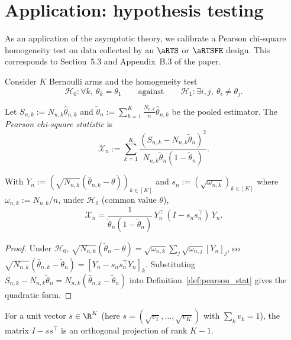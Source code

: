 \chapter{Application: hypothesis testing}
\label{chap:testing}

As an application of the asymptotic theory, we calibrate a Pearson chi-square
homogeneity test on data collected by an $\aRTS$ or $\aRTSFE$ design. This
corresponds to Section~5.3 and Appendix~B.3 of the paper.

Consider $K$ Bernoulli arms and the homogeneity test
\[
  \mathcal{H}_0 : \forall k,\ \theta_k = \theta_1
  \qquad\text{against}\qquad
  \mathcal{H}_1 : \exists i,j,\ \theta_i \ne \theta_j.
\]

\begin{definition}\label{def:pearson_stat}
Let $S_{n,k} := N_{n,k}\hat{\theta}_{n,k}$ and
$\tilde{\theta}_n := \sum_{k=1}^K \frac{N_{n,k}}{n}\hat{\theta}_{n,k}$ be the
pooled estimator. The \emph{Pearson chi-square statistic} is
\[
  \mathcal{X}_n := \sum_{k=1}^K \frac{(S_{n,k} - N_{n,k}\tilde{\theta}_n)^2}
                                        {N_{n,k}\tilde{\theta}_n(1-\tilde{\theta}_n)}.
\]
\end{definition}

\begin{lemma}\label{lem:pearson_quadform}
With $Y_n := (\sqrt{N_{n,k}}(\hat{\theta}_{n,k}-\theta))_{k\in[K]}$ and
$s_n := (\sqrt{\omega_{n,k}})_{k\in[K]}$ where $\omega_{n,k}:=N_{n,k}/n$, under
$\mathcal{H}_0$ (common value $\theta$),
\[
  \mathcal{X}_n = \frac{1}{\tilde{\theta}_n(1-\tilde{\theta}_n)}\,
                  Y_n^\top\,(I - s_n s_n^\top)\,Y_n.
\]
\end{lemma}

\begin{proof}
Under $\mathcal{H}_0$, $\sqrt{N_{n,k}}(\tilde{\theta}_n-\theta)
 = \sqrt{\omega_{n,k}}\sum_j\sqrt{\omega_{n,j}}[Y_n]_j$, so
$\sqrt{N_{n,k}}(\hat{\theta}_{n,k}-\tilde{\theta}_n) = [Y_n - s_n s_n^\top Y_n]_k$.
Substituting $S_{n,k}-N_{n,k}\tilde{\theta}_n = N_{n,k}(\hat{\theta}_{n,k}-\tilde{\theta}_n)$
into Definition~\ref{def:pearson_stat} gives the quadratic form.
\end{proof}

\begin{lemma}\label{lem:projection}
\leanok
For a unit vector $s\in\R^K$ (here $s=(\sqrt{v_1},\dots,\sqrt{v_K})$ with
$\sum_k v_k=1$), the matrix $I - s s^\top$ is an orthogonal projection of rank
$K-1$.
\end{lemma}

